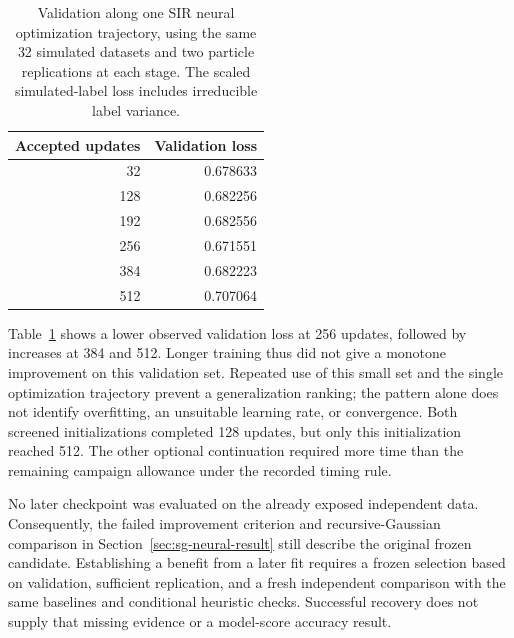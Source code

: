 \begin{table}[ht]
\centering
\begin{tabular}{rr}
\toprule
Accepted updates & Validation loss\\
\midrule
32  & 0.678633\\
128 & 0.682256\\
192 & 0.682556\\
256 & 0.671551\\
384 & 0.682223\\
512 & 0.707064\\
\bottomrule
\end{tabular}
\caption{Validation along one SIR neural optimization trajectory, using the
same 32 simulated datasets and two particle replications at each stage.
The scaled simulated-label loss includes irreducible label variance.}
\label{tab:sg-neural-continuation}
\end{table}

Table~\ref{tab:sg-neural-continuation} shows a lower observed validation loss at
256 updates, followed by increases at 384 and 512. Longer training thus did not
give a monotone improvement on this validation set. Repeated use of this small
set and the single optimization trajectory prevent a generalization ranking;
the pattern alone does not identify overfitting, an unsuitable learning rate,
or convergence. Both screened initializations completed 128 updates, but only
this initialization reached 512. The other optional continuation required more
time than the remaining campaign allowance under the recorded timing rule.

No later checkpoint was evaluated on the already exposed independent data.
Consequently, the failed improvement criterion and recursive-Gaussian comparison
in Section~\ref{sec:sg-neural-result} still describe the original frozen
candidate. Establishing a benefit from a later fit requires a frozen selection
based on validation, sufficient replication, and a fresh independent comparison
with the same baselines and conditional heuristic checks. Successful recovery
does not supply that missing evidence or a model-score accuracy result.
